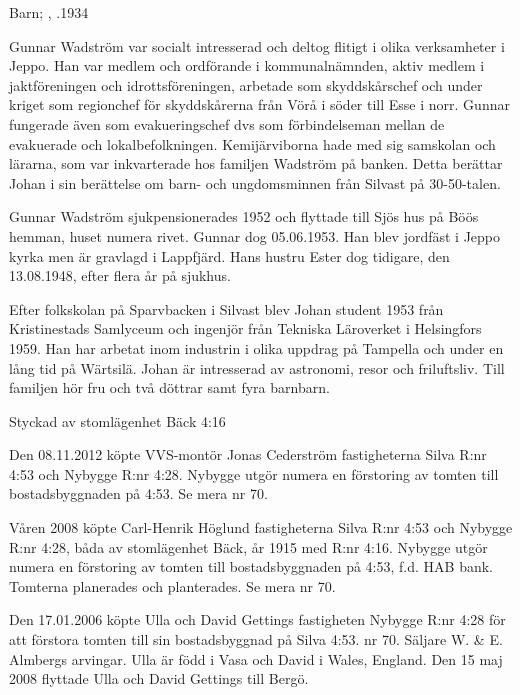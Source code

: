 Barn;	, .1934

Gunnar Wadström var socialt intresserad och deltog flitigt i olika verksamheter i Jeppo. Han var medlem och	ordförande 	i kommunalnämnden, aktiv medlem i jaktföreningen och idrottsföreningen, arbetade som skyddskårschef och under kriget som regionchef för skyddskårerna från Vörå i söder till Esse i norr. Gunnar fungerade även som evakueringschef dvs som förbindelseman mellan de evakuerade och lokalbefolkningen. Kemijärviborna hade med sig samskolan och lärarna, som var inkvarterade hos familjen Wadström på banken. Detta berättar Johan i sin berättelse om barn- och ungdomsminnen från Silvast på 30-50-talen.

Gunnar Wadström sjukpensionerades 1952 och flyttade till Sjös hus på Böös hemman, huset numera rivet. Gunnar dog 05.06.1953. Han blev jordfäst i Jeppo kyrka men är gravlagd i Lappfjärd. Hans hustru Ester dog tidigare, den 13.08.1948, efter flera år på sjukhus.

Efter folkskolan på Sparvbacken i Silvast blev Johan student 1953 från Kristinestads Samlyceum och ingenjör från Tekniska Läroverket i Helsingfors 1959. Han har arbetat inom industrin i olika uppdrag på Tampella och under en lång tid på Wärtsilä. Johan är intresserad av astronomi,	resor och friluftsliv. Till familjen hör fru och två döttrar samt fyra barnbarn.




Styckad av stomlägenhet Bäck 4:16

Den 08.11.2012 köpte VVS-montör Jonas Cederström fastigheterna Silva R:nr 4:53 och Nybygge R:nr 4:28. Nybygge utgör numera en förstoring av tomten till bostadsbyggnaden på 4:53. Se mera nr 70.


Våren 2008 köpte Carl-Henrik Höglund fastigheterna Silva R:nr 4:53 och Nybygge R:nr 4:28, båda av stomlägenhet Bäck, år 1915 med R:nr 4:16. Nybygge utgör numera en förstoring av tomten till bostadsbyggnaden på 4:53, f.d. HAB bank. Tomterna planerades och planterades. Se mera nr 70.


Den 17.01.2006 köpte Ulla och David Gettings fastigheten Nybygge R:nr 4:28 för att förstora tomten till sin		bostadsbyggnad på Silva 4:53. nr 70. Säljare W. \& E. Almbergs arvingar. Ulla är född i Vasa och David i Wales, England. Den 15 maj 2008 flyttade Ulla och David Gettings till Bergö.


